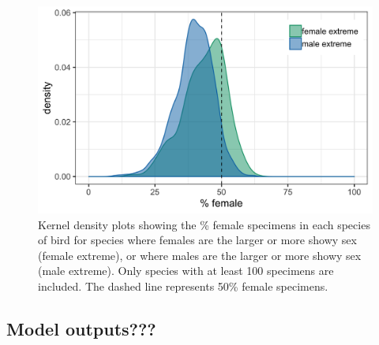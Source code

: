\documentclass[a4paper, 12pt]{article}
\begin{document}
\begin{figure}[H]
 \centering
  \includegraphics[width = \linewidth]{figures/female-extreme.png}
  \caption{Kernel density plots showing the \% female specimens in each species of bird for species where females are the larger or more showy sex (female extreme), or where males are the larger or more showy sex (male extreme). 
  Only species with at least 100 specimens are included. 
  The dashed line represents 50\% female specimens. }
  \label{fig-reverse}
\end{figure}


\newpage

\subsection*{Model outputs???}






\end{document}
